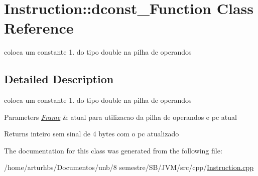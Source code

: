 \hypertarget{classInstruction_1_1dconst__1Function}{}\section{Instruction\+:\+:dconst\+\_\+Function Class Reference}
\label{classInstruction_1_1dconst__1Function}


coloca um constante 1. do tipo double na pilha de operandos  




\subsection{Detailed Description}
coloca um constante 1. do tipo double na pilha de operandos 


\begin{DoxyParams}{Parameters}
{\em \hyperlink{classFrame}{Frame}} & atual para utilizacao da pilha de operandos e pc atual \\
\hline
\end{DoxyParams}
\begin{DoxyReturn}{Returns}
inteiro sem sinal de 4 bytes com o pc atualizado 
\end{DoxyReturn}


The documentation for this class was generated from the following file\+:\begin{DoxyCompactItemize}
\item 
/home/arturhbs/\+Documentos/unb/8 semestre/\+S\+B/\+J\+V\+M/src/cpp/\hyperlink{Instruction_8cpp}{Instruction.\+cpp}\end{DoxyCompactItemize}
